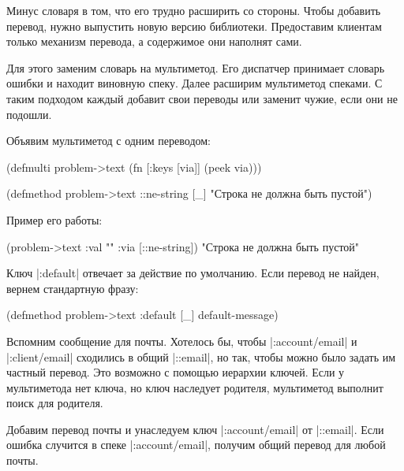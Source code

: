 Минус словаря в том, что его трудно расширить со стороны. Чтобы добавить
перевод, нужно выпустить новую версию библиотеки. Предоставим клиентам только
механизм перевода, а содержимое они наполнят сами.

Для этого заменим словарь на мультиметод. Его диспатчер принимает словарь ошибки
и находит виновную спеку. Далее расширим мультиметод спеками. С таким подходом
каждый добавит свои переводы или заменит чужие, если они не подошли.

Объявим мультиметод с одним переводом:


  \begin{clojure}
(defmulti problem->text
  (fn [{:keys [via]}]
    (peek via)))

(defmethod problem->text ::ne-string [_]
  "Строка не должна быть пустой")
  \end{clojure}

Пример его работы:

  \begin{clojure}
(problem->text {:val "" :via [::ne-string]})
"Строка не должна быть пустой"
  \end{clojure}

Ключ \spverb|:default| отвечает за действие по умолчанию. Если перевод не
найден, вернем стандартную фразу:

\begin{english}
  \begin{clojure}
(defmethod problem->text :default [_]
  default-message)
  \end{clojure}
\end{english}


Вспомним сообщение для почты. Хотелось бы, чтобы \spverb|:account/email| и
\spverb|:client/email| сходились в общий \spverb|::email|, но так, чтобы можно
было задать им частный перевод. Это возможно с помощью иерархии ключей. Если у
мультиметода нет ключа, но ключ наследует родителя, мультиметод выполнит поиск
для родителя.

Добавим перевод почты и унаследуем ключ \spverb|:account/email| от
\spverb|::email|. Если ошибка случится в спеке \spverb|:account/email|, получим
общий перевод для любой почты.

